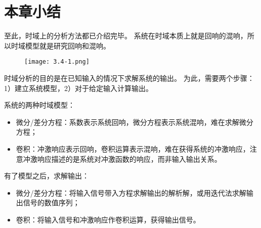 \section{本章小结}

至此，时域上的分析方法都已介绍完毕。
系统在时域本质上就是回响的混响，所以时域模型就是研究回响和混响。

\begin{figure}[h]
\centering
\texttt{[image: 3.4-1.png]}
\end{figure}

时域分析的目的是在已知输入的情况下求解系统的输出。
为此，需要两个步骤：1）建立系统模型，2）对于给定输入计算输出。

系统的两种时域模型：
\begin{itemize}
    \item 微分/差分方程：系数表示系统回响，微分方程表示系统混响，难在求解微分方程；
    \item 卷积：冲激响应表示回响，卷积运算表示混响，难在获得系统的冲激响应，注意冲激响应描述的是系统对冲激函数的响应，而非输入输出关系。
\end{itemize}

有了模型之后，求解输出：
\begin{itemize}
    \item 微分/差分方程：将输入信号带入方程求解输出的解析解，或用迭代法求解输出信号的数值序列；
    \item 卷积：将输入信号和冲激响应作卷积运算，获得输出信号。
\end{itemize}




